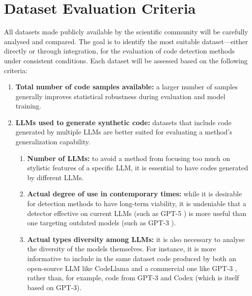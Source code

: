 \section{Dataset Evaluation Criteria}



All datasets made publicly available by the scientific 
community will be carefully analysed and compared. 
The goal is to identify the most suitable dataset—either 
directly or through integration, for the evaluation of code 
detection methods under consistent conditions. Each dataset 
will be assessed based on the following criteria:

\begin{enumerate}
    \item \textbf{Total number of code samples available:} 
    a larger number of samples generally improves statistical 
    robustness during evaluation and model training.
    
    \item \textbf{LLMs used to generate synthetic code:} 
    datasets that include code generated by multiple LLMs are better 
    suited for evaluating a method’s generalization capability.
    \begin{enumerate}
        \item \textbf{Number of LLMs:} 
        to avoid a method from focusing too much on 
        stylistic features of a specific LLM, it is essential 
        to have codes generated by different LLMs.
        \item \textbf{Actual degree of use in contemporary times:}
        while it is desirable for detection methods to have 
        long-term viability, it is undeniable that a detector 
        effective on current LLMs (such as GPT-5 \cite{openai2025gpt5}) is more useful 
        than one targeting outdated models (such as GPT-3 \cite{brown2020language}).
        \item \textbf{Actual types diversity among LLMs:}
        it is also necessary to analyse the diversity of the models 
        themselves. For instance, it is more informative to include 
        in the same dataset code produced by both an open-source LLM 
        like CodeLlama\cite{roziere2023code} 
        and a commercial one like GPT-3 \cite{brown2020language}, rather than, for 
        example, code from GPT-3 \cite{brown2020language} 
        and Codex \cite{chen2021codex} (which is itself based on GPT-3).
    \end{enumerate}
    

\end{enumerate}
